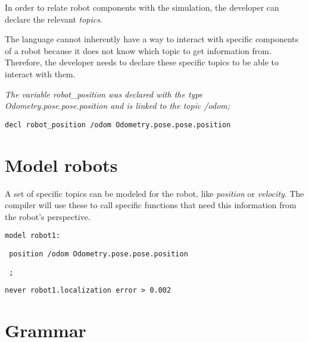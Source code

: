 In order to relate robot components with the simulation, the developer can declare the relevant \textit{topics}.

The language cannot inherently have a way to interact with specific components of a robot because it does not know which topic to get information from. Therefore, the developer needs to declare these specific topics to be able to interact with them.

\textit{The variable robot\_position was declared with the type Odometry.pose.pose.position and is linked to the topic /odom;}


\texttt{decl robot\_position /odom Odometry.pose.pose.position}

\section{Model robots}

A set of specific topics can be modeled for the robot, like \textit{position} or \textit{velocity}. The compiler will use these to call specific functions that need this information from the robot's perspective.


\texttt{model robot1:}

\texttt{    position /odom Odometry.pose.pose.position}

\texttt{    ;}


\texttt{never robot1.localization error > 0.002}

\section{Grammar}

